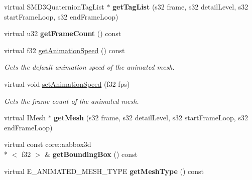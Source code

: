 \begin{DoxyCompactItemize}
\item 
\hypertarget{classirr_1_1scene_1_1_c_animated_mesh_m_d3_a15e0430a50a670b76e1f6f1f7232158b}{virtual S\-M\-D3\-Quaternion\-Tag\-List $\ast$ {\bfseries get\-Tag\-List} (s32 frame, s32 detail\-Level, s32 start\-Frame\-Loop, s32 end\-Frame\-Loop)}\label{classirr_1_1scene_1_1_c_animated_mesh_m_d3_a15e0430a50a670b76e1f6f1f7232158b}

\item 
\hypertarget{classirr_1_1scene_1_1_c_animated_mesh_m_d3_a25929f77ccc40de4a96f954d99811933}{virtual u32 {\bfseries get\-Frame\-Count} () const }\label{classirr_1_1scene_1_1_c_animated_mesh_m_d3_a25929f77ccc40de4a96f954d99811933}

\item 
virtual f32 \hyperlink{classirr_1_1scene_1_1_c_animated_mesh_m_d3_aa006a566bf0667a5c94c5c5ed8c0c32d}{get\-Animation\-Speed} () const 
\begin{DoxyCompactList}\small\item\em Gets the default animation speed of the animated mesh. \end{DoxyCompactList}\item 
virtual void \hyperlink{classirr_1_1scene_1_1_c_animated_mesh_m_d3_a30830507b65adc54b57ddfc82237bcab}{set\-Animation\-Speed} (f32 fps)
\begin{DoxyCompactList}\small\item\em Gets the frame count of the animated mesh. \end{DoxyCompactList}\item 
\hypertarget{classirr_1_1scene_1_1_c_animated_mesh_m_d3_a5869a28a89c82cbd7aed5651c1ae4e66}{virtual I\-Mesh $\ast$ {\bfseries get\-Mesh} (s32 frame, s32 detail\-Level, s32 start\-Frame\-Loop, s32 end\-Frame\-Loop)}\label{classirr_1_1scene_1_1_c_animated_mesh_m_d3_a5869a28a89c82cbd7aed5651c1ae4e66}

\item 
\hypertarget{classirr_1_1scene_1_1_c_animated_mesh_m_d3_a17e51dbf41a81df333d6185264033494}{virtual const core\-::aabbox3d\\*
$<$ f32 $>$ \& {\bfseries get\-Bounding\-Box} () const }\label{classirr_1_1scene_1_1_c_animated_mesh_m_d3_a17e51dbf41a81df333d6185264033494}

\item 
\hypertarget{classirr_1_1scene_1_1_c_animated_mesh_m_d3_a54973fd3a326e41d0398569cfd51b2d7}{virtual E\-\_\-\-A\-N\-I\-M\-A\-T\-E\-D\-\_\-\-M\-E\-S\-H\-\_\-\-T\-Y\-P\-E {\bfseries get\-Mesh\-Type} () const }\label{classirr_1_1scene_1_1_c_animated_mesh_m_d3_a54973fd3a326e41d0398569cfd51b2d7}


\end{DoxyCompactItemize}
